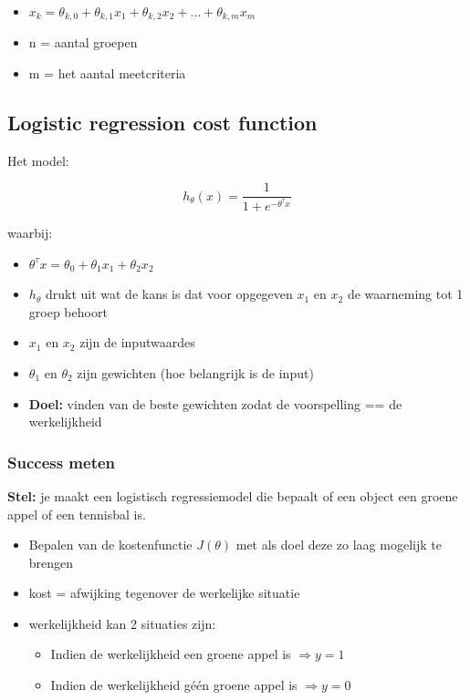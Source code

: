 \documentclass{article}
\begin{document}
\begin{itemize}
    \item $x_k = \theta_{k,0} + \theta_{k,1}x_1 + \theta_{k,2}x_2 + \dots + \theta_{k,m}x_m$
    \item n = aantal groepen
    \item m = het aantal meetcriteria
\end{itemize}

\subsection{Logistic regression cost function}

Het model:

\begin{equation}
h_{\theta}(x) = \frac{1}{1 + e^{-\theta^{\tau}x}}
\end{equation}

waarbij:

\begin{itemize}
    \item $\theta^{\tau}x = \theta_0 + \theta_1x_1 + \theta_2x_2$
    \item $h_{\theta}$ drukt uit wat de kans is dat voor opgegeven $x_1$ en $x_2$ de waarneming tot 1 groep behoort
    \item $x_1$ en $x_2$ zijn de inputwaardes
    \item $\theta_1$ en $\theta_2$ zijn gewichten (hoe belangrijk is de input)
    \item \textbf{Doel: } vinden van de beste gewichten zodat de voorspelling == de werkelijkheid
\end{itemize}

\subsubsection{Success meten}

\textbf{Stel:} je maakt een logistisch regressiemodel die bepaalt of een object een groene appel of een tennisbal is. 

\begin{itemize}
    \item Bepalen van de kostenfunctie $J(\theta)$ met als doel deze zo laag mogelijk te brengen
    \item kost = afwijking tegenover de werkelijke situatie
    \item werkelijkheid kan 2 situaties zijn:
    \begin{itemize}
        \item Indien de werkelijkheid een groene appel is $\Rightarrow y = 1$ 
        \item Indien de werkelijkheid géén groene appel is $\Rightarrow y = 0$ 
    \end{itemize}
\end{itemize}
\end{document}
